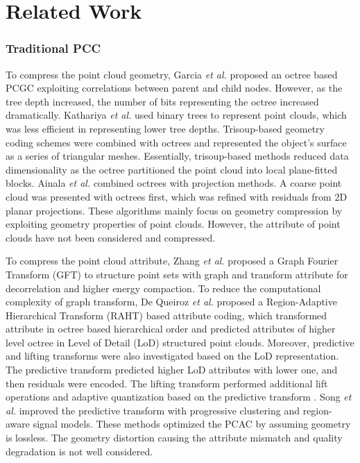 \section{Related Work}
\subsubsection{Traditional PCC}
To compress the point cloud geometry, Garcia \textit{et al.} \cite{garcia2018intra} proposed {an} octree based PCGC exploiting correlations between parent and child nodes. However, as the tree depth increased, the number of bits representing the octree increased dramatically. Kathariya \textit{et al.} \cite{kathariya2018scalable} used binary trees to represent point clouds, which was less efficient in representing lower tree depths. Trisoup-based geometry coding schemes were combined with octrees and represented the object's surface as a series of triangular meshes. Essentially, trisoup-based methods reduced data dimensionality as the octree partitioned the point cloud into local plane-fitted blocks. Ainala \textit{et al.} \cite{ainala2016improved} combined octrees with projection methods. A coarse point cloud was presented with octrees first, which was refined with residuals from 2D planar projections. These algorithms mainly focus on geometry compression by exploiting geometry {properties}  of point clouds. However, the attribute of point clouds have not been considered and compressed.
		
To compress the point cloud attribute, Zhang \textit{et al.} \cite{zhang2014point} proposed a Graph Fourier Transform (GFT) to structure point sets with graph and transform attribute for decorrelation and higher energy compaction. To reduce the computational complexity of graph transform, De Queiroz \textit{et al.} \cite{de2016compression} proposed a Region-Adaptive Hierarchical Transform (RAHT) based attribute coding, which transformed attribute in {octree} based hierarchical order and
predicted attributes of higher level octree in Level of Detail (LoD) structured point clouds. Moreover, predictive and lifting transforms were also investigated based on the LoD representation. The predictive transform predicted higher LoD attributes with lower one, and then residuals were encoded. The lifting transform performed additional lift operations and adaptive quantization based on the predictive transform \cite{chen2023introduction}. Song \textit{et al.} \cite{song2023block} improved the predictive transform with progressive clustering and region-aware signal models. These methods optimized the PCAC by assuming geometry is lossless. The geometry distortion causing the attribute mismatch and quality degradation is not well considered.
		
